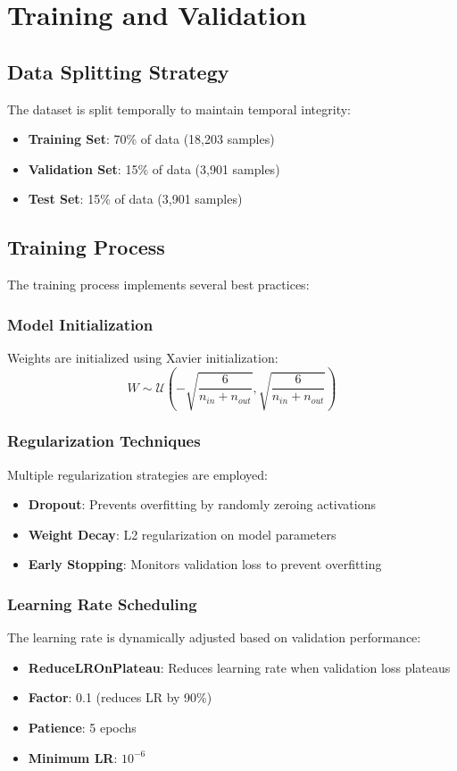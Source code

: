 \documentclass[12pt,a4paper]{article}
\begin{document}
\section{Training and Validation}

\subsection{Data Splitting Strategy}
The dataset is split temporally to maintain temporal integrity:
\begin{itemize}
    \item \textbf{Training Set}: 70\% of data (18,203 samples)
    \item \textbf{Validation Set}: 15\% of data (3,901 samples)
    \item \textbf{Test Set}: 15\% of data (3,901 samples)
\end{itemize}

\subsection{Training Process}
The training process implements several best practices:

\subsubsection{Model Initialization}
Weights are initialized using Xavier initialization:
\begin{equation}
W \sim \mathcal{U}\left(-\sqrt{\frac{6}{n_{in} + n_{out}}}, \sqrt{\frac{6}{n_{in} + n_{out}}}\right)
\end{equation}

\subsubsection{Regularization Techniques}
Multiple regularization strategies are employed:
\begin{itemize}
    \item \textbf{Dropout}: Prevents overfitting by randomly zeroing activations
    \item \textbf{Weight Decay}: L2 regularization on model parameters
    \item \textbf{Early Stopping}: Monitors validation loss to prevent overfitting
\end{itemize}

\subsubsection{Learning Rate Scheduling}
The learning rate is dynamically adjusted based on validation performance:
\begin{itemize}
    \item \textbf{ReduceLROnPlateau}: Reduces learning rate when validation loss plateaus
    \item \textbf{Factor}: 0.1 (reduces LR by 90\%)
    \item \textbf{Patience}: 5 epochs
    \item \textbf{Minimum LR}: $10^{-6}$
\end{itemize}
\end{document}
